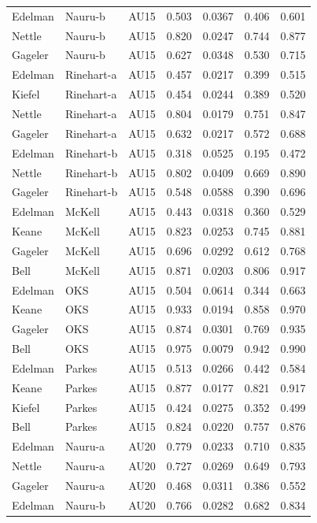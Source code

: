 \documentclass{monashthesis}
\begin{document}
\begin{center}
\begin{longtable}{lllllll}
Edelman & Nauru-b & AU15 & 0.503 & 0.0367 & 0.406 & 0.601 \\
Nettle & Nauru-b & AU15 & 0.820 & 0.0247 & 0.744 & 0.877 \\
Gageler & Nauru-b & AU15 & 0.627 & 0.0348 & 0.530 & 0.715 \\
Edelman & Rinehart-a & AU15 & 0.457 & 0.0217 & 0.399 & 0.515 \\
Kiefel & Rinehart-a & AU15 & 0.454 & 0.0244 & 0.389 & 0.520 \\
Nettle & Rinehart-a & AU15 & 0.804 & 0.0179 & 0.751 & 0.847 \\
Gageler & Rinehart-a & AU15 & 0.632 & 0.0217 & 0.572 & 0.688 \\
Edelman & Rinehart-b & AU15 & 0.318 & 0.0525 & 0.195 & 0.472 \\
Nettle & Rinehart-b & AU15 & 0.802 & 0.0409 & 0.669 & 0.890 \\
Gageler & Rinehart-b & AU15 & 0.548 & 0.0588 & 0.390 & 0.696 \\
Edelman & McKell & AU15 & 0.443 & 0.0318 & 0.360 & 0.529 \\
Keane & McKell & AU15 & 0.823 & 0.0253 & 0.745 & 0.881 \\
Gageler & McKell & AU15 & 0.696 & 0.0292 & 0.612 & 0.768 \\
Bell & McKell & AU15 & 0.871 & 0.0203 & 0.806 & 0.917 \\
Edelman & OKS & AU15 & 0.504 & 0.0614 & 0.344 & 0.663 \\
Keane & OKS & AU15 & 0.933 & 0.0194 & 0.858 & 0.970 \\
Gageler & OKS & AU15 & 0.874 & 0.0301 & 0.769 & 0.935 \\
Bell & OKS & AU15 & 0.975 & 0.0079 & 0.942 & 0.990 \\
Edelman & Parkes & AU15 & 0.513 & 0.0266 & 0.442 & 0.584 \\
Keane & Parkes & AU15 & 0.877 & 0.0177 & 0.821 & 0.917 \\
Kiefel & Parkes & AU15 & 0.424 & 0.0275 & 0.352 & 0.499 \\
Bell & Parkes & AU15 & 0.824 & 0.0220 & 0.757 & 0.876 \\
Edelman & Nauru-a & AU20 & 0.779 & 0.0233 & 0.710 & 0.835 \\
Nettle & Nauru-a & AU20 & 0.727 & 0.0269 & 0.649 & 0.793 \\
Gageler & Nauru-a & AU20 & 0.468 & 0.0311 & 0.386 & 0.552 \\
Edelman & Nauru-b & AU20 & 0.766 & 0.0282 & 0.682 & 0.834 \\

\end{longtable}
\end{center}
\end{document}
